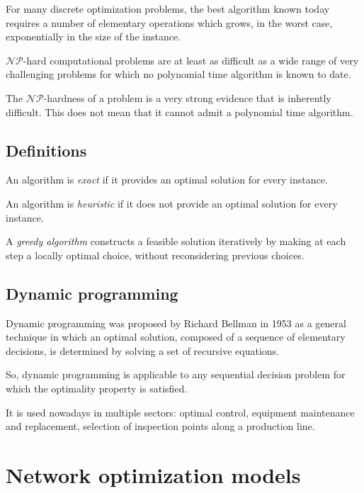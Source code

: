 \documentclass[12pt, a4paper]{report}
\begin{document}
    For many discrete optimization problems, the best algorithm known today requires a number of elementary operations which grows, in the worst case, exponentially in 
    the size of the instance. 
    \begin{definition}
        $\mathcal{N}\mathcal{P}$-hard computational problems are at least as difficult as a wide range of very challenging problems for which no polynomial time algorithm
        is known to date.
    \end{definition}
    The $\mathcal{N}\mathcal{P}$-hardness of a problem is a very strong evidence that is inherently difficult. This does not mean that it cannot admit a polynomial time 
    algorithm. 

    \section{Definitions}
    \begin{definition}
        An algorithm is \emph{exact} if it provides an optimal solution for every instance. 
        
        An algorithm is \emph{heuristic} if it does not provide an optimal solution for every instance.

        A \emph{greedy algorithm} constructs a feasible solution iteratively by making at each step a locally optimal choice, without reconsidering previous choices. 
    \end{definition}

    \section{Dynamic programming}
    Dynamic programming was proposed by Richard Bellman in 1953 as a general technique in which an optimal solution, composed of a sequence of elementary decisions, is determined 
    by solving a set of recursive equations. 
    
    So, dynamic programming is applicable to any sequential decision problem for which the optimality property is satisfied. 
    
    It is used nowadays in multiple sectors: optimal control, equipment maintenance and replacement, selection of inspection points along a production line. 

\newpage

\chapter{Network optimization models}
\end{document}
